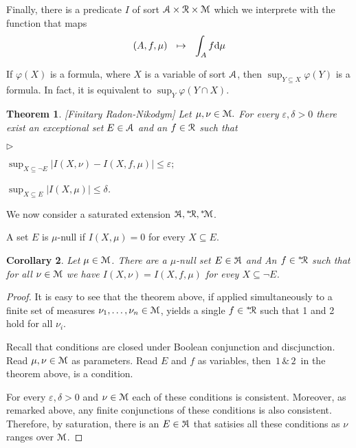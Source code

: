 \documentclass[12pt,letterpaper,oneside,reqno]{amsart}
\newcommand{\mylabel}[1]{{#1}\hfill}
\renewenvironment{itemize}
  {\begin{list}{$\triangleright$}{%
   \setlength{\parskip}{0mm}
   \setlength{\topsep}{.2\baselineskip}
   \setlength{\rightmargin}{0mm}
   \setlength{\listparindent}{0mm}
   \setlength{\itemindent}{0mm}
   \setlength{\labelwidth}{3ex}
   \setlength{\itemsep}{.2\baselineskip}
   \setlength{\parsep}{.2\baselineskip}
   \setlength{\partopsep}{0mm}
   \setlength{\labelsep}{1ex}
   \setlength{\leftmargin}{\labelwidth+\labelsep}
   \let\makelabel\mylabel}}{%
   \end{list}}
\theoremstyle{plain}
\newtheorem{theorem}{Theorem}%
\newtheorem{corollary}[theorem]{Corollary}
\theoremstyle{remark}
\begin{document}
Finally, there is a predicate $I$ of sort ${\EuScript A}\times{\EuScript R}\times{\EuScript M}$ which we interprete with the function that maps
$$
  (A,f,\mu)\ \ \mapsto\ \ \int_A f{\rm d}\mu
$$

If $\varphi(X)$ is a formula, where $X$ is a variable of sort ${\EuScript A}$, then $\sup_{Y\subseteq X}\varphi(Y)$ is a formula.
In fact, it is equivalent to $\sup_Y\varphi(Y\cap X)$.


\begin{theorem}\label{thm_fRN}
  [Finitary Radon-Nikodym]
  Let $\mu,\nu\in{\EuScript M}.$
  For every $\varepsilon,\delta > 0$ there exist an exceptional set $E\in{\EuScript A}$ and an $f\in{\EuScript R}$ such that
  \begin{itemize}
    \item[1.] $\displaystyle\sup_{X\subseteq\neg E}\big|I(X,\nu)- I(X,f,\mu)\big|\le\varepsilon;$
    \item[2.] $\displaystyle\sup_{X\subseteq E}|I(X, \mu)|\le\delta$.
  \end{itemize}
\end{theorem}

We now consider a saturated extension ${}^{*\!\!\!}{\EuScript A},{}^{*\!}{\EuScript R},{}^{*\!}{\EuScript M}$.

A set $E$ is $\mu$-null if $I(X, \mu)=0$ for every $X\subseteq E$.

\begin{corollary}
  Let $\mu\in{\EuScript M}$.
  There are a $\mu$-null set $E\in{}^{*\!\!\!}{\EuScript A}$ and An $f\in{}^{*\!}{\EuScript R}$ such that for all $\nu\in{\EuScript M}$ we have $I(X,\nu)=I(X,f,\mu)$ for evey $X\subseteq\neg E$.
\end{corollary}

\begin{proof}
  It is easy to see that the theorem above, if applied simultaneously to a finite set of measures $\nu_1,\dots,\nu_n\in{\EuScript M}$, yields a single $f\in{}^{*\!}{\EuScript R}$ such that 1 and 2 hold for all $\nu_i$.

  Recall that conditions are closed under Boolean conjunction and discjunction.
  Read $\mu,\nu\in{\EuScript M}$ as parameters.
  Read $E$ and $f$ as variables, then $\,1\, \&\, 2\,$ in the theorem above, is a condition.

  For every $\varepsilon,\delta>0$ and $\nu\in{\EuScript M}$ each of these conditions is consistent.
  Moreover, as remarked above, any finite conjunctions of these  conditions is also consistent.
  Therefore, by saturation, there is an $E\in{}^{*\!\!\!}{\EuScript A}$ that satisies all these conditions as $\nu$ ranges over ${\EuScript M}$.
\end{proof}
\end{document}
